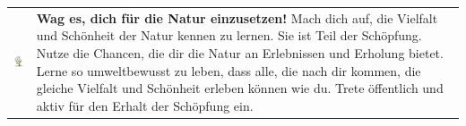 \begin{tabular}{m{2cm}m{10cm}}
	\includegraphics[width=2cm]{Ausgaben/Sola24/Grafiken/natur.png} & \textbf{Wag es, dich für die Natur einzusetzen!} \newline
	Mach dich auf, die Vielfalt und Schönheit der Natur kennen zu lernen. Sie ist Teil der Schöpfung. Nutze die Chancen, die dir die Natur an Erlebnissen und Erholung bietet. Lerne so umweltbewusst zu leben, dass alle, die nach dir kommen, die gleiche Vielfalt und Schönheit erleben können wie du. Trete öffentlich und aktiv für den Erhalt der Schöpfung ein. \\
	\end{tabular}